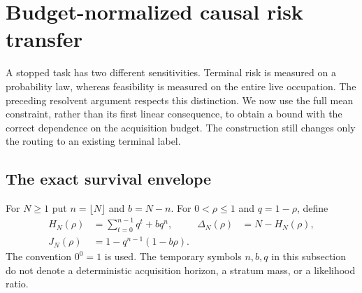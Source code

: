 \section{Budget-normalized causal risk transfer}\label{sec:sharp-transfer}
A stopped task has two different sensitivities. Terminal risk is measured on a probability law, whereas feasibility is measured on the entire live occupation. The preceding resolvent argument respects this distinction. We now use the full mean constraint, rather than its first linear consequence, to obtain a bound with the correct dependence on the acquisition budget. The construction still changes only the routing to an existing terminal label.

\subsection{The exact survival envelope}
For $N\ge1$ put $n=\lfloor N\rfloor$ and $b=N-n$. For $0<\rho\le1$ and $q=1-\rho$, define
\begin{align}
 H_N(\rho)&=\sum_{t=0}^{n-1}q^t+bq^n,
 &\Delta_N(\rho)&=N-H_N(\rho),\label{eq:survival-envelope}\\
 J_N(\rho)&=1-q^{n-1}(1-b\rho).
 \label{eq:replacement-envelope}
\end{align}
The convention $0^0=1$ is used. The temporary symbols $n,b,q$ in this subsection do not denote a deterministic acquisition horizon, a stratum mass, or a likelihood ratio.

